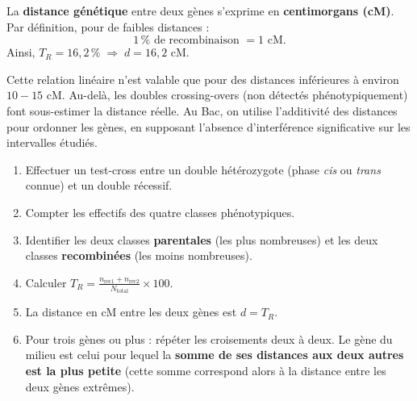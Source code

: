 \documentclass[11pt]{article}
\begin{document}
\begin{propriete}
La \textbf{distance génétique} entre deux gènes s’exprime en \textbf{centimorgans (cM)}. Par définition, pour de faibles distances :
\[
1\,\% \text{ de recombinaison } = 1 \text{ cM}.
\]
Ainsi, $T_R = 16,2\,\% \;\Rightarrow\; d = 16,2 \text{ cM}$.
\end{propriete}

\begin{attention}[Limite de la relation $d = T_R$]
Cette relation linéaire n'est valable que pour des distances inférieures à environ $10-15$ cM. Au-delà, les doubles crossing-overs (non détectés phénotypiquement) font sous-estimer la distance réelle. Au Bac, on utilise l'additivité des distances pour ordonner les gènes, en supposant l'absence d'interférence significative sur les intervalles étudiés.
\end{attention}

\begin{methode}
\begin{enumerate}
\item Effectuer un test‑cross entre un double hétérozygote (phase \emph{cis} ou \emph{trans} connue) et un double récessif.
\item Compter les effectifs des quatre classes phénotypiques.
\item Identifier les deux classes \textbf{parentales} (les plus nombreuses) et les deux classes \textbf{recombinées} (les moins nombreuses).
\item Calculer $T_R = \frac{n_{\text{rec1}}+n_{\text{rec2}}}{N_{\text{total}}}\times 100$.
\item La distance en cM entre les deux gènes est $d = T_R$.
\item Pour trois gènes ou plus : répéter les croisements deux à deux. Le gène du milieu est celui pour lequel la \textbf{somme de ses distances aux deux autres est la plus petite} (cette somme correspond alors à la distance entre les deux gènes extrêmes).
\end{enumerate}
\end{methode}
\end{document}
